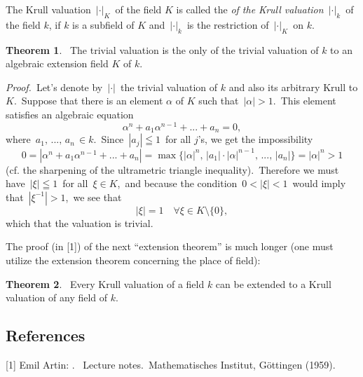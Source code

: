 \documentclass[12pt]{article}
\theoremstyle{definition}
\newtheorem{thmplain}{Theorem}
\begin{document}
The Krull valuation\, $|\cdot|_K$\, of the field $K$ is called the {\em {} of the Krull valuation} \,$|\cdot|_k$\, of the field $k$, if $k$ is a subfield of $K$ and\, $|\cdot|_k$\, is the restriction of\, $|\cdot|_K$\, on $k$.

\begin{thmplain}\, The trivial valuation is the only  of the trivial valuation of $k$ to an algebraic extension field $K$ of $k$.
\end{thmplain}

{\em Proof.}\, Let's denote by\, $|\cdot|$\, the trivial valuation of $k$ and also its arbitrary Krull  to $K$.\, Suppose that there is an element $\alpha$ of $K$ such that\, $|\alpha| > 1$.\, This element satisfies an algebraic equation
     $$\alpha^n+a_1\alpha^{n-1}+...+a_n = 0,$$
where\, $a_1,\, ..., \,a_n\, \in k$.\, Since\, $|a_j| \leqq 1$\, for all $j$'s, we get the impossibility
 $$0 = |\alpha^n+a_1\alpha^{n-1}+...+a_n| =
\max\{|\alpha|^n,\,|a_1|\!\cdot|\!\alpha|^{n-1},\, ...,\, |a_n|\} = 
|\alpha|^n > 1$$
(cf. the sharpening of the ultrametric triangle inequality).\, Therefore we must have\, $|\xi| \leqq 1$\, for all\, $\xi\in K$, \,and because the condition\, $0 < |\xi| < 1$\, would imply that\, $|\xi^{-1}| > 1$,\, we see that 
              $$|\xi| = 1 \quad \forall\xi\in K\!\setminus\!\{0\},$$
which  that the valuation is trivial.

The proof (in [1]) of the next ``extension theorem'' is much longer (one must utilize the extension theorem concerning the place of field):

\begin{thmplain}\, Every Krull valuation of a field $k$ can be extended to a Krull valuation of any  field of $k$.
\end{thmplain}

\subsection*{References}
[1] Emil Artin: . \, Lecture notes.\, Mathematisches Institut, G\"ottingen (1959).
\end{document}
